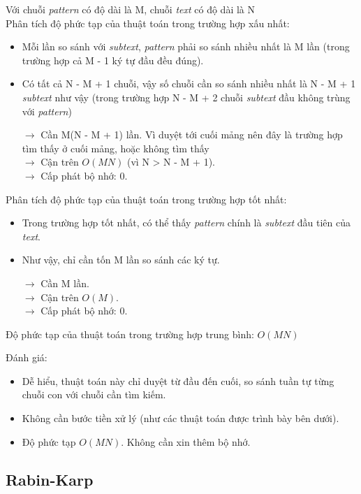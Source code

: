 \documentclass[a4paper,11pt]{article}
\begin{document}
			Với chuỗi \textit{pattern} có độ dài là M, chuỗi \textit{text} có độ dài là N \\
			Phân tích độ phức tạp của thuật toán trong trường hợp xấu nhất:
			\begin{itemize}
				\item Mỗi lần so sánh với \textit{subtext}, \textit{pattern} phải so sánh nhiều nhất là M lần (trong trường hợp cả M - 1 ký tự đầu đều đúng).
				\item Có tất cả N - M + 1 chuỗi, vậy số chuỗi cần so sánh nhiều nhất là N - M + 1 \textit{subtext} như vậy (trong trường hợp N - M + 2 chuỗi \textit{subtext} đầu không trùng với \textit{pattern})
				
				$\to$ Cần M(N - M + 1) lần. Vì duyệt tới cuối mảng nên đây là trường hợp tìm thấy ở cuối mảng, hoặc không tìm thấy\\
				$\to$ Cận trên $O(MN)$ (vì N > N - M + 1). \\
				$\to$ Cấp phát bộ nhớ: 0.
			\end{itemize}

			Phân tích độ phức tạp của thuật toán trong trường hợp tốt nhất:
			\begin{itemize}
				\item Trong trường hợp tốt nhất, có thể thấy \textit{pattern} chính là \textit{subtext} đầu tiên của \textit{text}.
				\item Như vậy, chỉ cần tốn M lần so sánh các ký tự.
				
				$\to$ Cần M lần. \\
				$\to$ Cận trên $O(M)$. \\
				$\to$ Cấp phát bộ nhớ: 0.
			\end{itemize}

			Độ phức tạp của thuật toán trong trường hợp trung bình: $O(MN)$
			
			Đánh giá:
			\begin{itemize}
				\item Dễ hiểu, thuật toán này chỉ duyệt từ đầu đến cuối, so sánh tuần tự từng chuỗi con với chuỗi cần tìm kiếm.
				\item Không cần bước tiền xử lý (như các thuật toán được trình bày bên dưới).
				\item Độ phức tạp $O(MN)$. Không cần xin thêm bộ nhớ.
			\end{itemize}

		\subsection {Rabin-Karp}
		
\end{document}
